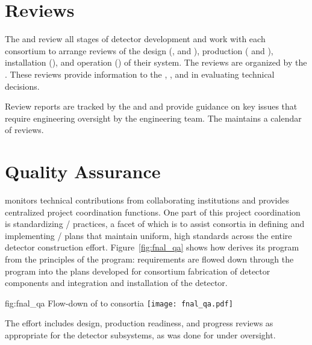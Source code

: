 \section{Reviews}
\label{sec:es-tc-reviews}

The  and  review all stages of detector development
and work with each consortium to arrange reviews of the design
(,  and ), production (
and ), installation (), and operation
() of their system. The reviews are organized by the
 .  These
reviews provide information to the , , and 
in evaluating technical decisions. 

Review reports are tracked by the   and  and provide
guidance on key issues that require engineering oversight by the
 engineering team. The   maintains a
calendar of  reviews. 

\section{Quality Assurance}
\label{sec:es-tc-qa}

  monitors technical contributions from
collaborating institutions and provides centralized project
coordination functions. One part of this project coordination is
standardizing / practices, a facet
of which is to assist consortia in defining and implementing
/ plans that maintain uniform, high
standards across the entire detector construction
effort. Figure~\ref{fig:fnal_qa} shows how  
derives its  program from the principles of the \fnal {} program:
requirements are flowed down through the 
 program into the  plans developed for consortium fabrication of
detector components and integration and installation of the detector.
\begin{dunefigure}{fig:fnal_qa}
  {Flow-down of \fnal {} to consortia}
  \texttt{[image: fnal\_qa.pdf]}
\end{dunefigure}
The  effort includes design, production readiness, and
progress reviews as appropriate for the  detector
subsystems, as was done for  under 
oversight.

